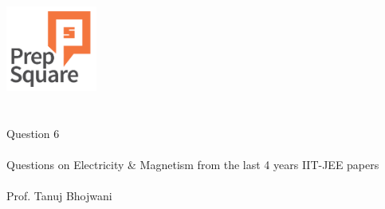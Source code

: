 \documentclass{beamer}
\begin{document}
\begin{center}
\ \\ \ \\
\includegraphics[width=30mm]{Logo-final.png} \\
\ \\ \ \\ 
{\huge Question 6 \\ \ \\ }
{\Large
Questions on Electricity \& Magnetism from the last 4 years IIT-JEE papers
}
{\large \ \\ \ \\ Prof. Tanuj Bhojwani }
\end{center}
\end{document}
